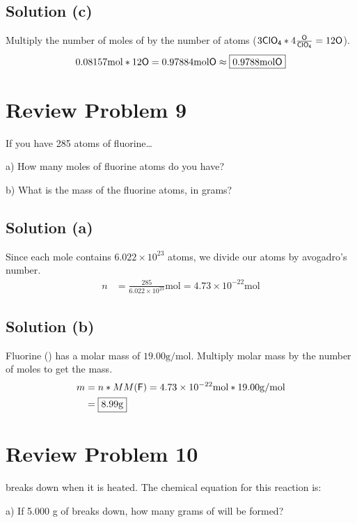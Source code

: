 \documentclass[10pt]{article}
\begin{document}
        \subsection{Solution (c)}
            Multiply the number of moles of  by the number of  atoms ($ 3 \ce{ClO4} * 4 \ce{\frac{O}{ClO4}} = 12 \ce{O} $).
            \begin{equation}
                0.08157 \unit{\mol} * 12 \ce{O} = 0.97884 \unit{\mol} \ce{O} \approx \boxed{0.9788 \unit{\mol} \ce{O}}
            \end{equation}
    
    \pagebreak
    \section{Review Problem 9}
        If you have 285 atoms of fluorine…
        
        a) How many moles of fluorine atoms do you have?
        
        b) What is the mass of the fluorine atoms, in grams?

        \subsection{Solution (a)}
            Since each mole contains $6.022 \times 10^{23}$ atoms, we divide our atoms by avogadro's number.
            \begin{align}
                n   &=  \frac{285}{6.022 \times 10^{23}} \unit{\mol}
                    =   \boxed{4.73 \times 10^{-22} \unit{\mol}}
            \end{align}

        \subsection{Solution (b)}
            Fluorine () has a molar mass of $19.00 \unit{\gram/\mol}$.
            Multiply molar mass by the number of moles to get the mass.
            \begin{align}
                m   &=  n * MM(\ce{F})
                    =   4.73 \times 10^{-22} \unit{\mol} * 19.00 \unit{\gram/\mol}\\
                    &=  \boxed{8.99 \unit{\gram}}
            \end{align}

    \pagebreak
    \section{Review Problem 10}
         breaks down when it is heated. The chemical equation for this reaction is:
        \begin{center}
        \end{center}
        a) If 5.000 g of  breaks down, how many grams of  will be formed?
        
\end{document}
